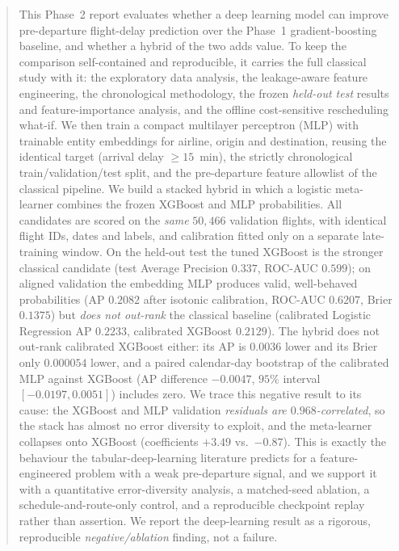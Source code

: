 \documentclass[conference]{IEEEtran}
\begin{document}
\begin{abstract}
This Phase~2 report evaluates whether a deep learning model can improve
pre-departure flight-delay prediction over the Phase~1 gradient-boosting
baseline, and whether a hybrid of the two adds value. To keep the comparison
self-contained and reproducible, it carries the full classical study with it:
the exploratory data analysis, the leakage-aware feature engineering, the
chronological methodology, the frozen \emph{held-out test} results and
feature-importance analysis, and the offline cost-sensitive rescheduling
what-if. We then train a compact multilayer perceptron (MLP) with trainable
entity embeddings for airline, origin and destination, reusing the identical
target (arrival delay $\geq 15$~min), the strictly chronological
train/validation/test split, and the pre-departure feature allowlist of the
classical pipeline. We build a stacked hybrid in which a logistic meta-learner
combines the frozen XGBoost and MLP probabilities. All candidates are scored on
the \emph{same} $50{,}466$ validation flights, with identical flight IDs, dates
and labels, and calibration fitted only on a separate late-training window. On
the held-out test the tuned XGBoost is the stronger classical candidate (test
Average Precision $0.337$, ROC-AUC $0.599$); on aligned validation the embedding
MLP produces valid, well-behaved probabilities (AP $0.2082$ after isotonic
calibration, ROC-AUC $0.6207$, Brier $0.1375$) but \emph{does not out-rank} the
classical baseline (calibrated Logistic Regression AP $0.2233$, calibrated
XGBoost $0.2129$). The hybrid does not out-rank calibrated XGBoost either: its AP
is $0.0036$ lower and its Brier only $0.000054$ lower, and a paired calendar-day
bootstrap of the calibrated MLP against XGBoost (AP difference $-0.0047$, $95\%$
interval $[-0.0197, 0.0051]$) includes zero. We trace this negative result to its cause:
the XGBoost and MLP validation \emph{residuals are $0.968$-correlated}, so the
stack has almost no error diversity to exploit, and the meta-learner collapses
onto XGBoost (coefficients $+3.49$ vs.\ $-0.87$). This is exactly the behaviour
the tabular-deep-learning literature predicts for a feature-engineered problem
with a weak pre-departure signal, and we support it with a quantitative
error-diversity analysis, a matched-seed ablation, a schedule-and-route-only
control, and a reproducible checkpoint replay rather than assertion. We report
the deep-learning result as a rigorous, reproducible \emph{negative/ablation}
finding, not a failure.
\end{abstract}
\end{document}
